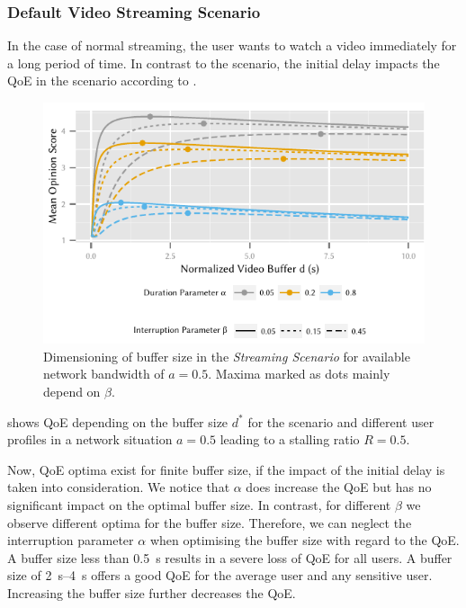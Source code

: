 \subsubsection*{Default Video Streaming Scenario}\label{sec:application:qoe_user_behaviour:typical_user_scenarios:default}

In the case of normal streaming, the user wants to watch a video immediately for a long period of time.
In contrast to the \watchLater scenario, the initial delay impacts the \gls{QoE} in the \watchNow scenario according to .

\begin{figure}
  \centering
  \includegraphics{application/qoe_user_behaviour/user_scenarios/figures/default_scenario}
  \caption{Dimensioning of buffer size in the \emph{Streaming Scenario} for available network bandwidth of \(a = 0.5\). Maxima marked as dots mainly depend on \(\beta\).}
  \label{fig:application:qoe_user_behaviour:typical_user_scenarios:default:default_scenario}
\end{figure}

 shows \gls{QoE} depending on the buffer size \(d^*\) for the \watchNow scenario and different user profiles in a network situation \(a=0.5\) leading to a stalling ratio \(R=0.5\).

Now, \gls{QoE} optima exist for finite buffer size, if the impact of the initial delay is taken into consideration. 
We notice that \(\alpha\) does increase the \gls{QoE} but has no significant impact on the optimal buffer size.
In contrast, for different \(\beta\) we observe different optima for the buffer size.
Therefore, we can neglect the interruption parameter \(\alpha\) when optimising the buffer size with regard to the \gls{QoE}.
A buffer size less than \SI{0.5}{\second} results in a severe loss of \gls{QoE} for all users.
A buffer size of \SIrange{2}{4}{\second} offers a good \gls{QoE} for the average user and any sensitive user.
Increasing the buffer size further decreases the \gls{QoE}.

